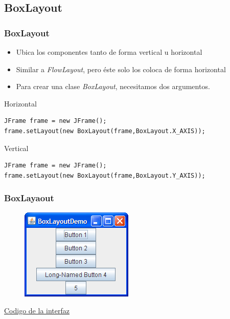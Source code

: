 \documentclass{beamer}
\begin{document}
\subsection{BoxLayout}

\begin{frame}[fragile]
    \frametitle{BoxLayout}
\begin{itemize}[<+->]
\item Ubica los componentes tanto de forma vertical u horizontal
\item Similar a \emph{FlowLayout}, pero éste solo los coloca de forma horizontal
\item Para crear una clase \emph{BoxLayout}, necesitamos dos argumentos.
\end{itemize}
\pause
\begin{block}{Horizontal}
\begin{verbatim}
JFrame frame = new JFrame();
frame.setLayout(new BoxLayout(frame,BoxLayout.X_AXIS));
\end{verbatim}
\end{block}
\pause
\begin{block}{Vertical}
\begin{verbatim}
JFrame frame = new JFrame();
frame.setLayout(new BoxLayout(frame,BoxLayout.Y_AXIS));
\end{verbatim}
\end{block}
\end{frame}

\begin{frame}[fragile]
    \frametitle{BoxLayaout}
  \begin{figure}
\includegraphics[scale=0.7]{imagenes/bl1.png}
\end{figure}  
\begin{center}{\color{blue}
\href{https://docs.oracle.com/javase/tutorial/displayCode.html?code=https://docs.oracle.com/javase/tutorial/uiswing/examples/layout/BoxLayoutDemoProject/src/layout/BoxLayoutDemo.java}
{Codigo de la interfaz}}
\end{center}
\end{frame}
\end{document}
